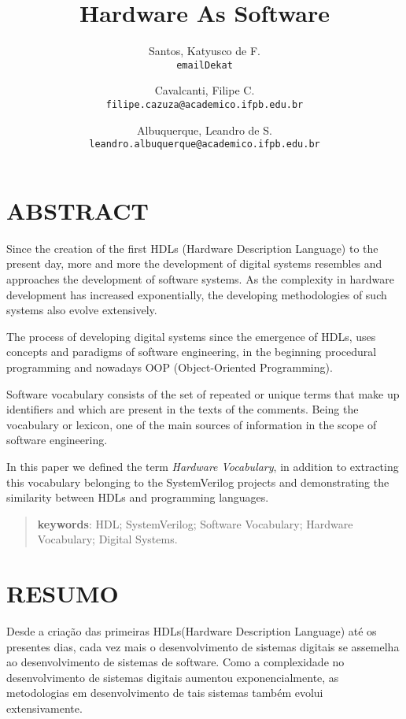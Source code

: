 \documentclass[12pt, twocolumn, a4paper]{article}
\begin{document}
	\title{Hardware As Software}
	\author{Santos, Katyusco de F.\\
	\texttt{emailDekat}
	\and
	Cavalcanti, Filipe C.\\
	\texttt{filipe.cazuza@academico.ifpb.edu.br}
	\and
	Albuquerque, Leandro de S.\\
	\texttt{leandro.albuquerque@academico.ifpb.edu.br}}
	\maketitle
	
	\section{ABSTRACT}
	\quad Since the creation of the first HDLs (Hardware Description Language) to the present day, more and more the development of digital systems resembles and approaches the development of software systems. As the complexity in hardware development has increased exponentially, the developing methodologies of such systems also evolve extensively.
	
The process of developing digital systems since the emergence of HDLs, uses concepts and paradigms of software engineering, in the beginning procedural programming and nowadays OOP (Object-Oriented Programming).

Software vocabulary consists of the set of repeated or unique terms that make up identifiers and which are present in the texts of the comments. Being the vocabulary or lexicon, one of the main sources of information in the scope of software engineering.

In this paper we defined the term \textit{Hardware Vocabulary}, in addition to extracting this vocabulary belonging to the SystemVerilog projects and demonstrating the similarity between HDLs and programming languages.
\begin{quote}
\textbf{keywords}: HDL; SystemVerilog; Software Vocabulary; Hardware Vocabulary; Digital Systems.
\end{quote}

	\section{RESUMO}
	\quad Desde a criação das primeiras HDLs(Hardware Description Language) até os presentes dias, cada vez mais o desenvolvimento de sistemas digitais se assemelha ao desenvolvimento de sistemas de software. Como a complexidade no desenvolvimento de sistemas digitais aumentou exponencialmente, as metodologias em desenvolvimento de tais sistemas também evolui extensivamente. %
\end{document}
